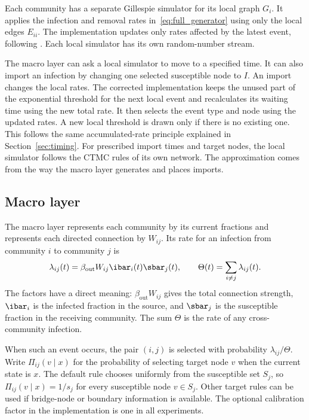Each community has a separate Gillespie simulator for its local graph $G_i$. It applies the infection and removal rates in~\eqref{eq:full_generator} using only the local edges $E_{ii}$. The implementation updates only rates affected by the latest event, following \citet{kuryliak2025simulating}. Each local simulator has its own random-number stream.

The macro layer can ask a local simulator to move to a specified time. It can also import an infection by changing one selected susceptible node to $I$. An import changes the local rates. The corrected implementation keeps the unused part of the exponential threshold for the next local event and recalculates its waiting time using the new total rate. It then selects the event type and node using the updated rates. A new local threshold is drawn only if there is no existing one. This follows the same accumulated-rate principle explained in Section~\ref{sec:timing}. For prescribed import times and target nodes, the local simulator follows the CTMC rules of its own network. The approximation comes from the way the macro layer generates and places imports.

\subsection{Macro layer}
\label{sec:macro}

The macro layer represents each community by its current fractions and represents each directed connection by $W_{ij}$. Its rate for an infection from community $i$ to community $j$ is
\begin{equation}
\label{eq:macro_rate}
\lambda_{ij}(t)=\beta_{\mathrm{out}}W_{ij}\ibar_i(t)\sbar_j(t),
\qquad
\Theta(t)=\sum_{i\neq j}\lambda_{ij}(t).
\end{equation}
The factors have a direct meaning: $\beta_{\mathrm{out}}W_{ij}$ gives the total connection strength, $\ibar_i$ is the infected fraction in the source, and $\sbar_j$ is the susceptible fraction in the receiving community. The sum $\Theta$ is the rate of any cross-community infection.

When such an event occurs, the pair $(i,j)$ is selected with probability $\lambda_{ij}/\Theta$. Write $\Pi_{ij}(v\mid x)$ for the probability of selecting target node $v$ when the current state is $x$. The default rule chooses uniformly from the susceptible set $S_j$, so $\Pi_{ij}(v\mid x)=1/s_j$ for every susceptible node $v\in S_j$. Other target rules can be used if bridge-node or boundary information is available. The optional calibration factor in the implementation is one in all experiments.

